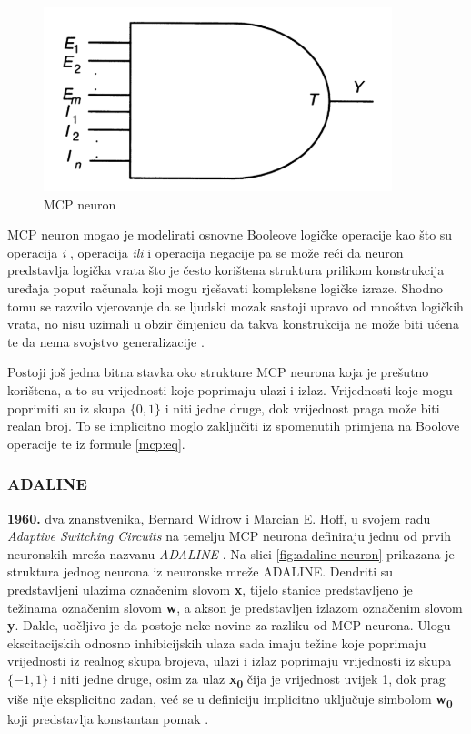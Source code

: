 \documentclass[times, utf8, zavrsni]{fer}
\begin{document}
\begin{figure}[H]
    \centering
    \includegraphics{img/first-ai-neuron.png}
    \caption[Caption for LOF]{MCP neuron\footnotemark}
    \label{fig:first-ai-neuron}
\end{figure}

MCP neuron mogao je modelirati osnovne Booleove logičke operacije kao što su operacija \textit{i} , operacija \textit{ili}  i operacija negacije  pa se može reći da neuron predstavlja logička vrata  što je često korištena struktura prilikom konstrukcija uređaja poput računala koji mogu rješavati kompleksne logičke izraze. Shodno tomu se razvilo vjerovanje da se ljudski mozak sastoji upravo od mnoštva logičkih vrata, no nisu uzimali u obzir činjenicu da takva konstrukcija ne može biti učena te da nema svojstvo generalizacije \citep{picton2000}. 

Postoji još jedna bitna stavka oko strukture MCP neurona koja je prešutno korištena, a to su vrijednosti koje poprimaju ulazi i izlaz. Vrijednosti koje mogu poprimiti su iz skupa $\{0, 1\}$ i niti jedne druge, dok vrijednost praga može biti realan broj. To se implicitno moglo zaključiti iz spomenutih primjena na Boolove operacije te iz formule \eqref{mcp:eq}.

\subsubsection{ADALINE}
\textbf{1960.} dva znanstvenika, Bernard Widrow i Marcian E. Hoff, u svojem radu \textit{Adaptive Switching Circuits} na temelju MCP neurona definiraju jednu od prvih neuronskih mreža nazvanu \textit{ADALINE} . Na slici \ref{fig:adaline-neuron} prikazana je struktura jednog neurona iz neuronske mreže ADALINE. Dendriti su predstavljeni ulazima označenim slovom \textbf{x}, tijelo stanice predstavljeno je težinama označenim slovom \textbf{w}, a akson je predstavljen izlazom označenim slovom \textbf{y}. Dakle, uočljivo je da postoje neke novine za razliku od MCP neurona. Ulogu ekscitacijskih odnosno inhibicijskih ulaza sada imaju težine koje poprimaju vrijednosti iz realnog skupa brojeva, ulazi i izlaz poprimaju vrijednosti iz skupa $\{-1, 1\}$ i niti jedne druge, osim za ulaz \textbf{x\textsubscript{0}} čija je vrijednost uvijek 1, dok prag više nije eksplicitno zadan, već se u definiciju implicitno uključuje simbolom \textbf{w\textsubscript{0}} koji predstavlja konstantan pomak  \citep{picton2000}.
\end{document}
